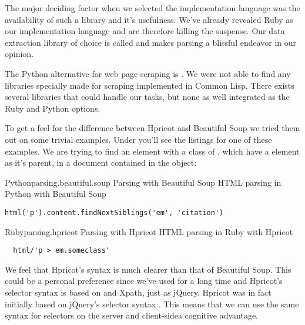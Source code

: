 The major deciding factor when we selected the implementation language was
the availability of such a library and it's usefulness. We've already
revealed Ruby as our implementation language and are therefore killing the
suspense. Our data extraction library of choice is called %
and makes  parsing a blissful endeavor in our opinion.

The Python alternative for web page scraping is .
We were not able to find any libraries specially made for  scraping
implemented in Common Lisp. There exists several %
libraries that could handle our tasks, but none as well integrated as
the Ruby and Python options.

To get a feel for the difference between Hpricot and Beautiful Soup we tried
them out on some trivial examples. Under you'll see the listings for one
of these examples. We are trying to find an  element with a class
of , which have a  element as it's parent,
in a  document contained in the  object:

\begin{scode}{Python}{parsing.beautiful.soup}{%
  Parsing with Beautiful Soup}{%
  HTML parsing in Python with Beautiful Soup}
\begin{lstlisting}
html('p').content.findNextSiblings('em', 'citation')
\end{lstlisting}
\end{scode}

\begin{scode}{Ruby}{parsing.hpricot}{%
  Parsing with Hpricot}{%
  HTML parsing in Ruby with Hpricot}
\begin{lstlisting}
  html/'p > em.someclass'
\end{lstlisting}
\end{scode}

We feel that Hpricot's syntax is much clearer than that of Beautiful Soup.
This could be a personal preference since we've used  for a long
time and Hpricot's selector syntax is based on  and Xpath, just as
jQuery. Hpricot was in fact initially based on jQuery's selector syntax
\citep{why06}. This means that we can use the same syntax for selectors on the
server and client-side\emph{}a cognitive advantage.

